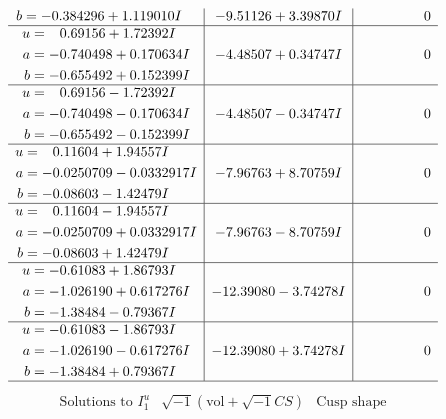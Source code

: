 \documentclass[1p]{elsarticle_modified}
\theoremstyle{definition}
\newcommand{\I}{\sqrt{-1}}
\begin{document}
$$\begin{array}{c|c|c}
\begin{aligned}
b &= -0.384296 + 1.119010 I\end{aligned}
 & -9.51126 + 3.39870 I & \phantom{-0.000000 } 0 \\ \hline\begin{aligned}
u &= \phantom{-}0.69156 + 1.72392 I \\
a &= -0.740498 + 0.170634 I \\
b &= -0.655492 + 0.152399 I\end{aligned}
 & -4.48507 + 0.34747 I & \phantom{-0.000000 } 0 \\ \hline\begin{aligned}
u &= \phantom{-}0.69156 - 1.72392 I \\
a &= -0.740498 - 0.170634 I \\
b &= -0.655492 - 0.152399 I\end{aligned}
 & -4.48507 - 0.34747 I & \phantom{-0.000000 } 0 \\ \hline\begin{aligned}
u &= \phantom{-}0.11604 + 1.94557 I \\
a &= -0.0250709 - 0.0332917 I \\
b &= -0.08603 - 1.42479 I\end{aligned}
 & -7.96763 + 8.70759 I & \phantom{-0.000000 } 0 \\ \hline\begin{aligned}
u &= \phantom{-}0.11604 - 1.94557 I \\
a &= -0.0250709 + 0.0332917 I \\
b &= -0.08603 + 1.42479 I\end{aligned}
 & -7.96763 - 8.70759 I & \phantom{-0.000000 } 0 \\ \hline\begin{aligned}
u &= -0.61083 + 1.86793 I \\
a &= -1.026190 + 0.617276 I \\
b &= -1.38484 - 0.79367 I\end{aligned}
 & -12.39080 - 3.74278 I & \phantom{-0.000000 } 0 \\ \hline\begin{aligned}
u &= -0.61083 - 1.86793 I \\
a &= -1.026190 - 0.617276 I \\
b &= -1.38484 + 0.79367 I\end{aligned}
 & -12.39080 + 3.74278 I & \phantom{-0.000000 } 0\\
 \hline 
 \end{array}$$\newpage$$\begin{array}{c|c|c}  
\text{Solutions to }I^u_{1}& \I (\text{vol} + \sqrt{-1}CS) & \text{Cusp shape}\\

\end{array}$$
\end{document}
